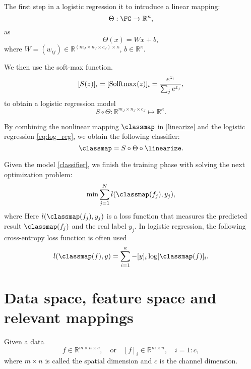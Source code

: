 The first step in a logistic regression it to introduce a linear mapping:
\begin{equation*}
\Theta: \FC \to\mathbb{R}^{\kappa} ,
\end{equation*}as 
\begin{equation}\label{thetamap}
\Theta(x)=Wx+b,
\end{equation}
where $W=(w_{ij})\in\mathbb{R}^{(m_J \times n_J \times c_J)\times \kappa}$, 
$b\in\mathbb{R}^{\kappa}$.


We then use the soft-max function.
\begin{equation}
\label{softmax}
[S(z)]_i=[{\rm Solftmax}(z)]_i= \frac{e^{z_i}}{\sum_{j} e^{z_j}},
\end{equation}
to obtain a logistic regression model 
\begin{equation}
\label{eq:log_reg}
S \circ \Theta: \mathbb R^{m_J\times n_J\times c_J}\mapsto \mathbb R^\kappa.
\end{equation}

By combining the nonlinear mapping $\classmap$ in \eqref{linearize}
and the logistic regression \eqref{eq:log_reg}, we obtain the following classifier:
\begin{equation}
\label{classifier}
\classmap=  S\circ \Theta\circ \linearize.
\end{equation}

Given the model \eqref{classifier},
we finish the training phase with solving the next optimization 
problem:
\begin{equation}
\label{eq:abstractloss}
\min \sum_{j=1}^Nl(\classmap(f_j),y_j),
\end{equation}
where
Here $l(\classmap(f_j),y_j)$ is a  loss function that measures the
predicted result $\classmap(f_j)$ and the real label $y_j$. 
In logistic regression, 
the following cross-entropy loss function is often used
\begin{equation}\label{eq:cross-entropy}
l(\classmap(f), y) = \sum_{i=1}^\kappa -[y]_i \log [\classmap(f)]_i.
\end{equation}

\section{Data space, feature space and relevant mappings}\label{sec:spaces}
Given a data
\begin{equation}
\label{data-f}
f \in \mathbb{R}^{m \times n \times c}, 
\quad \text{or}\quad [f]_i \in
\mathbb{R}^{m\times n}, \quad i = 1:c,
\end{equation}
where $m\times n$ is called the spatial dimension and $c$ is the 
channel dimension.

